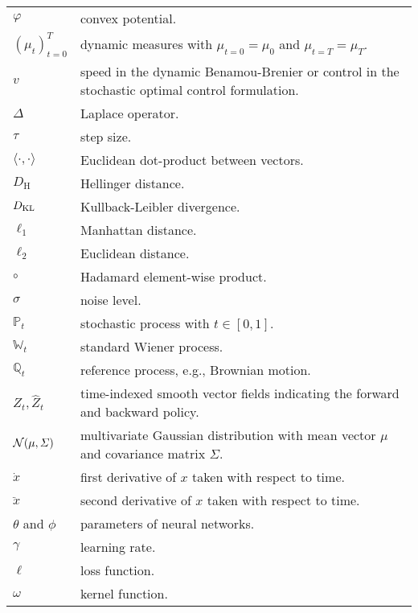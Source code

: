 \begin{tabularx}{\textwidth}{lX}
 	$\varphi$ & convex potential. \\
 	$(\mu_t)_{t=0}^T$ & dynamic measures with $\mu_{t=0} = \mu_0$ and $\mu_{t=T} = \mu_T$. \\
 	$v$ & speed in the dynamic Benamou-Brenier or control in the stochastic optimal control formulation. \\
 	$\Delta$ & Laplace operator. \\
 	$\tau$ & step size. \\
 	$\langle\cdot, \cdot\rangle$ & Euclidean dot-product between vectors. \\
 	$D_{\mathrm{H}}$ & Hellinger distance. \\
 	$D_{\mathrm{KL}}$ & Kullback-Leibler divergence. \\
 	$\ell_1$ & Manhattan distance. \\
 	$\ell_2$ & Euclidean distance. \\
 	$\circ$ & Hadamard element-wise product. \\
 	$\sigma$ & noise level. \\
 	$\mathbb{P}_t$ & stochastic process with $t \in [0,1]$. \\
 	$\mathbb{W}_t$ & standard Wiener process. \\
 	$\mathbb{Q}_t$ & reference process, e.g., Brownian motion. \\
 	$Z_t, \hat{Z}_t$ & time-indexed smooth vector fields indicating the forward and backward policy. \\
 	${\mathcal{N}}(\mu, \Sigma)$ & multivariate Gaussian distribution with mean vector $\mu$ and covariance matrix $\Sigma$. \\
 	$\dot{x}$ & first derivative of $x$ taken with respect to time. \\
 	$\ddot{x}$ & second derivative of $x$ taken with respect to time. \\
 	$\theta$ and $\phi$ & parameters of neural networks. \\
 	$\gamma$ & learning rate. \\
 	$\ell$ & loss function. \\
 	$\omega$ & kernel function. \\
 	
\end{tabularx}


